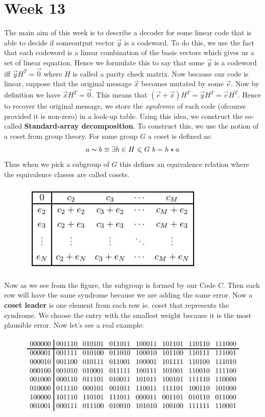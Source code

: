 \documentclass[titlepage]{article}
\begin{document}
\section{Week 13}
The main aim of this week is to describe a decoder for some linear code that is able to decide if someoutput vector $\vec{y}$ is a codeword. To do this, we use the fact that each codeword is a linear combination of the basis vectors which gives us a set of linear equation. Hence we formulate this to say that some $\vec{y}$ is a codeword iff $\vec{y}H^{T} = \vec{0}$ where $H$ is called a parity check matrix. Now because our code is linear, suppose that the original message $\vec{x}$ becomes mutated by some $\vec{e}$. Now by definition we have $\vec{x}H^{T} = \vec{0}$. This means that $(\vec{e} + \vec{x})H^{T} = \vec{y}H^{T} = \vec{e}H^{T}$. Hence to recover the original message, we store the \textit{syndrome} of each code (ofcourse provided it is non-zero) in a look-up table. Using this idea, we construct the so-called \textbf{Standard-array decomposition}. To construct this, we use the notion of a coset from group theory. For some group $G$ a coset is defined as:
$$ a \thicksim b \equiv \exists h \in H \leqslant G \ b = h \star a$$ Thus when we pick a subgroup of $G$ this defines an equivalence relation where the equivalence classes are called cosets. 

\begin{figure}[H]
    \centering
    \includegraphics{src/coset.JPG}
    \label{fig:my_label}
\end{figure}

Now as we see from the figure, the subgroup is formed by our Code $C$. Then each row will have the same syndrome because we are adding the same error. Now a \textbf{coset leader} is one element from each row ie. coset that represents the syndrome. We choose the entry with the smallest weight because it is the most plausible error. Now let's see a real example:

\begin{figure}[H]
    \centering
    \includegraphics{src/cosres.JPG}
    \label{fig:my_label}
\end{figure}
\end{document}
